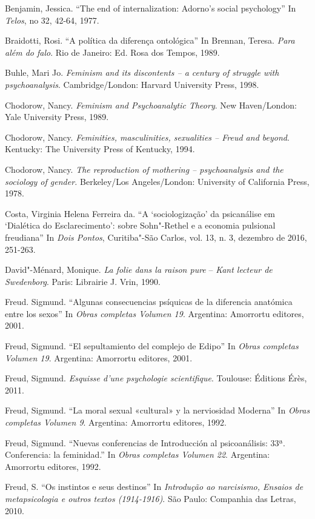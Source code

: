 Benjamin, Jessica. ``The end of internalization: Adorno's social
psychology'' In \emph{Telos}, no 32, 42-64, 1977.

Braidotti, Rosi. ``A política da diferença ontológica'' In Brennan,
Teresa. \emph{Para além do falo}. Rio de Janeiro: Ed. Rosa dos Tempos,
1989.

Buhle, Mari Jo. \emph{Feminism and its discontents -- a century of
struggle with psychoanalysis}. Cambridge/London: Harvard University
Press, 1998.

Chodorow, Nancy. \emph{Feminism and Psychoanalytic Theory}. New
Haven/London: Yale University Press, 1989.

Chodorow, Nancy. \emph{Feminities, masculinities, sexualities -- Freud
and beyond}. Kentucky: The University Press of Kentucky, 1994.

Chodorow, Nancy. \emph{The reproduction of mothering -- psychoanalysis
and the sociology of gender.} Berkeley/Los Angeles/London: University of
California Press, 1978.

Costa, Virginia Helena Ferreira da. ``A `sociologização' da
psicanálise em `Dialética do Esclarecimento': sobre Sohn"-Rethel e a
economia pulsional freudiana'' In \emph{Dois Pontos}, Curitiba"-São
Carlos, vol. 13, n. 3, dezembro de 2016, 251-263.

David"-Ménard, Monique. \emph{La folie dans la raison
pure} -- \emph{Kant lecteur de Swedenborg}. Paris: Librairie J. Vrin,
1990.

Freud. Sigmund. ``Algunas consecuencias psíquicas de la diferencia
anatómica entre los sexos'' In \emph{Obras completas Volumen 19}.
Argentina: Amorrortu editores, 2001.

Freud, Sigmund. ``El sepultamiento del complejo de Edipo'' In
\emph{Obras completas Volumen 19}. Argentina: Amorrortu editores, 2001.

Freud, Sigmund. \emph{Esquisse d'une psychologie scientifique}.
Toulouse: Éditions Érès, 2011.

Freud, Sigmund. ``La moral sexual «cultural» y la nerviosidad
Moderna'' In \emph{Obras completas Volumen 9}. Argentina: Amorrortu
editores, 1992.

Freud, Sigmund. ``Nuevas conferencias de Introducción al
psicoanálisis: 33ª. Conferencia: la feminidad.'' In \emph{Obras
completas Volumen 22}. Argentina: Amorrortu editores, 1992.

Freud, S. ``Os instintos e seus destinos'' In
\emph{Introdução ao narcisismo, Ensaios de metapsicologia e outros
textos (1914-1916)}. São Paulo: Companhia das Letras, 2010.

